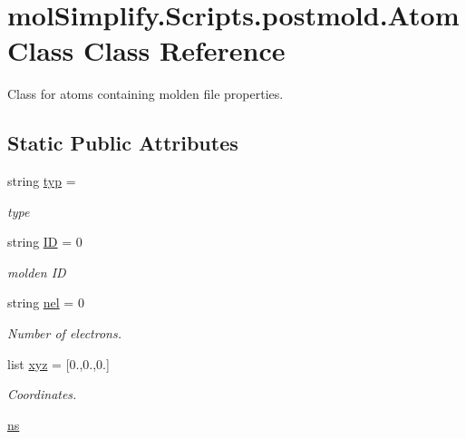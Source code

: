 \hypertarget{classmolSimplify_1_1Scripts_1_1postmold_1_1AtomClass}{}\section{mol\+Simplify.\+Scripts.\+postmold.\+Atom\+Class Class Reference}
\label{classmolSimplify_1_1Scripts_1_1postmold_1_1AtomClass}


Class for atoms containing molden file properties.  


\subsection*{Static Public Attributes}
\begin{DoxyCompactItemize}
\item 
string \hyperlink{classmolSimplify_1_1Scripts_1_1postmold_1_1AtomClass_a37cfb7b1b499a1272e18582eab7839a3}{typ} = \textquotesingle{}\textquotesingle{}
\begin{DoxyCompactList}\small\item\em type \end{DoxyCompactList}\item 
string \hyperlink{classmolSimplify_1_1Scripts_1_1postmold_1_1AtomClass_a88654cc776a9ecbdf4ab54ed253a8316}{ID} = \textquotesingle{}0\textquotesingle{}
\begin{DoxyCompactList}\small\item\em molden ID \end{DoxyCompactList}\item 
string \hyperlink{classmolSimplify_1_1Scripts_1_1postmold_1_1AtomClass_a7c7758c809bb012bdf445dd8fa8b8ed4}{nel} = \textquotesingle{}0\textquotesingle{}
\begin{DoxyCompactList}\small\item\em Number of electrons. \end{DoxyCompactList}\item 
list \hyperlink{classmolSimplify_1_1Scripts_1_1postmold_1_1AtomClass_aade993f602af3531ad83b9d42658c76b}{xyz} = \mbox{[}\textquotesingle{}0.\textquotesingle{},\textquotesingle{}0.\textquotesingle{},\textquotesingle{}0.\textquotesingle{}\mbox{]}
\begin{DoxyCompactList}\small\item\em Coordinates. \end{DoxyCompactList}\item 
\hyperlink{classmolSimplify_1_1Scripts_1_1postmold_1_1AtomClass_a9026012f703319cabe282d158710d4ec}{ns}

\end{DoxyCompactItemize}
